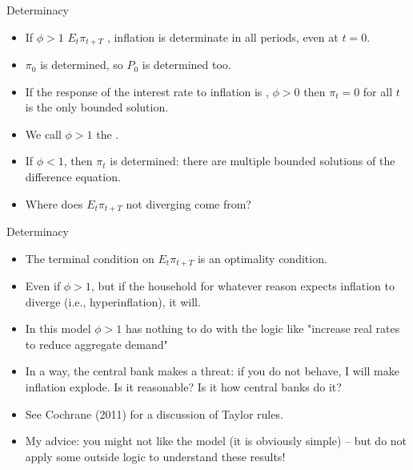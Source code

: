 \documentclass[11pt,xcolor={dvipsnames},aspectratio=159,hyperref={pdftex,pdfpagemode=UseNone,hidelinks,pdfdisplaydoctitle=true},usepdftitle=false]{beamer}
\begin{document}
    \begin{frame}{Determinacy}
        \begin{itemize}
                \item If $\phi>1$  $E_t \pi_{t+T}$ , inflation is determinate in all periods, even at $t=0$.
                \item $\pi_0$ is determined, so $P_0$ is determined too. 
                \item If the response of the interest rate to inflation is , $\phi>0$ then $\pi_t = 0$ for all $t$ is the only bounded solution.
                \item We call $\phi>1$ the .
                \item If $\phi<1$, then $\pi_t$ is  determined: there are multiple bounded solutions of the difference equation.
                \item Where does $E_t \pi_{t+T}$ not diverging come from? 
            \end{itemize}
        \end{frame}

    \begin{frame}{Determinacy}
        \begin{itemize}
                \item The terminal condition on $E_t \pi_{t+T}$ is  an optimality condition. 
                \item Even if $\phi>1$, but if the household for whatever reason expects inflation to diverge (i.e., hyperinflation), it will.
                \item In this model $\phi>1$ has nothing to do with the logic like "increase real rates to reduce aggregate demand"
                \item In a way, the central bank makes a threat: if you do not behave, I will make inflation explode. Is it reasonable? Is it how central banks do it?
                \item See Cochrane (2011) for a discussion of Taylor rules.
                \item My advice: you might not like the model (it is obviously simple) -- but do not apply some outside logic to understand these results!
            \end{itemize}
        \end{frame}
\end{document}
